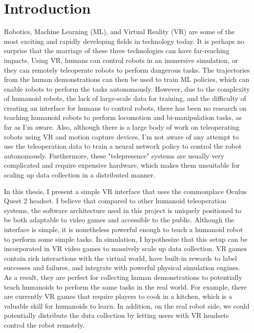 \chapter{Introduction}

Robotics, Machine Learning (ML), and Virtual Reality (VR) are some of the most exciting and rapidly developing fields in technology today. It is perhaps no surprise that the marriage of these three technologies can have far-reaching impacts. Using VR, humans can control robots in an immersive simulation, or they can remotely teleoperate robots to perform dangerous tasks. The trajectories from the human demonstrations can then be used to train ML policies, which can enable robots to perform the tasks autonomously. 
However, due to the complexity of humanoid robots, the lack of large-scale data for training, and the difficulty of creating an interface for humans to control robots, there has been no research on teaching humanoid robots to perform locomotion and bi-manipulation tasks, as far as I'm aware. Also, although there is a large body of work on teleoperating robots using VR  and motion capture devices, I'm not aware of any attempt to use the teleoperation data to train a neural network policy to control the robot autonomously. Furthermore, these 
"telepresence" systems are usually very complicated and require expensive hardware, which makes them unsuitable for scaling up data collection in a distributed manner. 

In this thesis, I present a simple VR interface that uses the commonplace Oculus Quest 2 headset. I believe that compared to other humanoid teleoperation systems, the software architecture used in this project is uniquely positioned to be both adaptable to video games and accessible to the public. Although the interface is simple, it is nonetheless powerful enough to teach a humanoid robot to perform some simple tasks. In simulation, I hypothesize that this setup can be incorporated in VR video games to massively scale up data collection. VR games contain rich interactions with the virtual world, have built-in rewards to label successes and failures, and integrate with powerful physical simulation engines. As a result, they are perfect for collecting human demonstrations to potentially teach humanoids to perform the same tasks in the real world. For example, there are currently VR games that require players to cook in a kitchen, which is a valuable skill for humanoids to learn. In addition, on the real robot side, we could potentially distribute the data collection by letting users with VR headsets control the robot remotely. 
